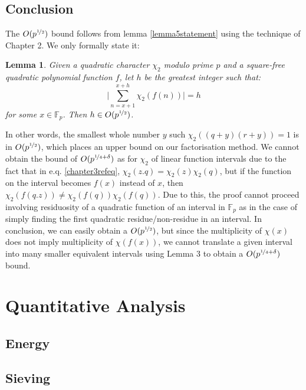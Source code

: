 \documentclass{report}
\newtheorem*{lemma*}{Lemma}
\begin{document}
\section{Conclusion}
%
The $O(p^{\nicefrac{1}{2}})$ bound follows from lemma \ref{lemma5statement} using the technique of Chapter 2. We only formally state it:
\begin{lemma*}
Given a quadratic character $\chi_2$ modulo prime $p$ and a square-free quadratic polynomial function $f$, let $h$ be the greatest integer such that:
\[\bigg\lvert\sum\limits_{n=x+1}^{x+h}\chi_2(f(n))\bigg\rvert=h\]
 for some $x\in\mathbb{F}_p$. Then $h\in O(p^{\nicefrac{1}{2}})$.
\end{lemma*}
In other words, the smallest whole number $y$ such $\chi_2((q+y)(r+y))=1$ is in $O(p^{\nicefrac{1}{2}})$, which places an upper bound on our factorisation method.
We cannot obtain the bound of $O(p^{\nicefrac{1}{4}+\delta})$ as for $\chi_2$ of linear function intervals due to the fact that in e.q. \ref{chapter3refeq}, $\chi_2(z.q)=\chi_2(z)\chi_2(q)$, but if the function on the interval becomes $f(x)$ instead of $x$, then $\chi_2(f(q.z))\neq \chi_2(f(q))\chi_2(f(q))$. Due to this, the proof cannot proceed involving residuosity of a quadratic function of an interval in $\mathbb{F}_p$ as in the case of simply finding the first quadratic residue/non-residue in an interval. In conclusion, we can easily obtain a $O(p^{\nicefrac{1}{2}})$, but since the multiplicity of $\chi(x)$ does not imply multiplicity of $\chi(f(x))$, we cannot translate a given interval into many smaller equivalent intervals using Lemma 3 to obtain a $O(p^{\nicefrac{1}{4}+\delta})$ bound.
%
%
%
\chapter{Quantitative Analysis}
\section{Energy}
%
%
\section{Sieving}
%
%
\end{document}

